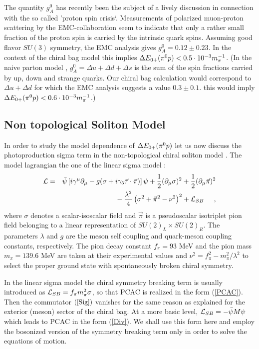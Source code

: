 The quantity $g_A^0$ 
has recently been the subject of a lively discussion in  
connection with the so called 'proton spin crisis`. Measurements of 
polarized muon-proton scattering by the EMC-collaboration \cite{EMC}
seem to indicate that only a rather small fraction of the proton
spin is carried by the intrinsic quark spins. Assuming good flavor $SU(3)$
symmetry, the EMC analysis \cite{EMC} gives $g_A^0 =0.12 \pm 0.23$.
In the context of the chiral bag model this implies $\Delta E_{0+}(\pi^0 p) <0.5\cdot 10^{-3}m_{\pi}^{-1}$.
(In the naive parton model , $g_A^0=\Delta u +\Delta d+\Delta s$  is the sum
of  the  spin fractions carried by up, down and strange quarks. Our
chiral bag calculation would correspond to $\Delta u+\Delta d$ for which
the EMC analysis suggests a value $0.3\pm0.1$. this would imply 
$\Delta E_{0+}(\pi^0 p)<0.6 \cdot 10^{-3}m_{\pi}^{-1}$.) 


\subsection{Non topological Soliton Model}
In order to study the model dependence of $\Delta E_{0+}(\pi^0 p)$ let us now discuss
the photoproduction sigma term in the non-topological chiral soliton 
model \cite{Bir}. The model lagrangian the one of the linear
sigma model :
\begin{eqnarray}
\label{Lsig}
{\cal L}&=&\bar{\psi}\left[ i\gamma^{\mu}\partial_{\mu}
-g(\sigma+i\gamma_5\vec{\tau}\cdot\vec{\pi})\right]\psi 
+\frac{1}{2}(\partial_{\mu}\sigma)^2
+\frac{1}{2}(\partial_{\mu}\vec{\pi})^2 \nonumber \\
& &\mbox{}-\frac{\lambda^2}{4}\left(\sigma^2+\vec{\pi}^2-\nu^2\right)^2
 + {\cal L}_{SB} \hspace{0.5cm},
\end{eqnarray}  
where $\sigma$ denotes a scalar-isoscalar field and $\vec{\pi}$ is a
pseudoscalar isotriplet pion field belonging to a linear representation of
$SU(2)_L\times SU(2)_R$. The parameters $\lambda$ and $g$ are the meson self
coupling and quark-meson coupling constants, respectively. The pion decay
constant $f_\pi=93$ MeV and the pion mass $m_{\pi}=139.6$ MeV are 
taken at their experimental values and $\nu^2=f_{\pi}^2-m_{\pi}^2 /
\lambda^2$ to select the proper ground state with spontaneously broken 
chiral symmetry. 

In the linear sigma model the chiral symmetry breaking term is usually
introduced as ${\cal L}_{SB}= f_\pi m_\pi^2 \sigma$, so that PCAC is
realized in the form (\ref{PCAC}). Then the commutator $(\ref{Sig})$
vanishes for the same reason as explained for the exterior (meson)
sector of the chiral bag. At a more basic level, ${\cal L}_{SB}=
-\bar{\psi}M\psi$ which leads to PCAC in the form (\ref{Div}). We
shall use this form here and employ the bosonized version of 
the symmetry breaking term only in order to solve the equations
of motion.  

